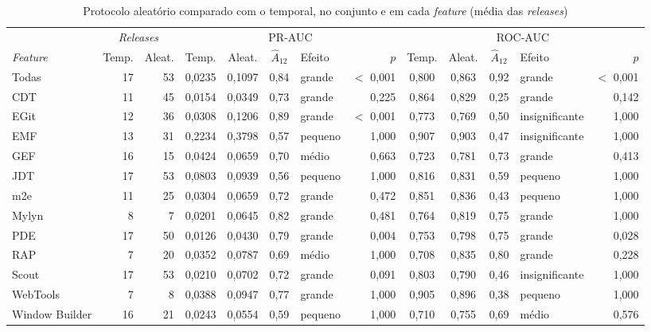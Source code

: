 \begin{table}[htbp]
    
    \centering
    \scriptsize
    \setlength{\tabcolsep}{3pt}%
    \caption{Protocolo aleatório comparado com o temporal, no conjunto e em cada \textit{feature} (média das \textit{releases})}
    \label{tab:res-a12-features}
    \begin{tabular}{lrrccclrccclr}
        \toprule
         & \multicolumn{2}{c}{\textit{Releases}} & \multicolumn{5}{c}{PR-AUC} & \multicolumn{5}{c}{ROC-AUC} \\
        \cmidrule(lr){2-3}\cmidrule(lr){4-8}\cmidrule(lr){9-13}
        \textit{Feature} & Temp. & Aleat. & Temp. & Aleat. & $\hat{A}_{12}$ & Efeito & $p$ & Temp. & Aleat. & $\hat{A}_{12}$ & Efeito & $p$ \\
        \midrule
        Todas & 17 & 53 & 0,0235 & 0,1097 & 0,84 & grande & $<$ 0,001 & 0,800 & 0,863 & 0,92 & grande & $<$ 0,001 \\
        \midrule
        CDT & 11 & 45 & 0,0154 & 0,0349 & 0,73 & grande & 0,225 & 0,864 & 0,829 & 0,25 & grande & 0,142 \\
        EGit & 12 & 36 & 0,0308 & 0,1206 & 0,89 & grande & $<$ 0,001 & 0,773 & 0,769 & 0,50 & insignificante & 1,000 \\
        EMF & 13 & 31 & 0,2234 & 0,3798 & 0,57 & pequeno & 1,000 & 0,907 & 0,903 & 0,47 & insignificante & 1,000 \\
        GEF & 16 & 15 & 0,0424 & 0,0659 & 0,70 & médio & 0,663 & 0,723 & 0,781 & 0,73 & grande & 0,413 \\
        JDT & 17 & 53 & 0,0803 & 0,0939 & 0,56 & pequeno & 1,000 & 0,816 & 0,831 & 0,59 & pequeno & 1,000 \\
        m2e & 11 & 25 & 0,0304 & 0,0659 & 0,72 & grande & 0,472 & 0,851 & 0,836 & 0,43 & pequeno & 1,000 \\
        Mylyn & 8 & 7 & 0,0201 & 0,0645 & 0,82 & grande & 0,481 & 0,764 & 0,819 & 0,75 & grande & 1,000 \\
        PDE & 17 & 50 & 0,0126 & 0,0430 & 0,79 & grande & 0,004 & 0,753 & 0,798 & 0,75 & grande & 0,028 \\
        RAP & 7 & 20 & 0,0352 & 0,0787 & 0,69 & médio & 1,000 & 0,708 & 0,835 & 0,80 & grande & 0,228 \\
        Scout & 17 & 53 & 0,0210 & 0,0702 & 0,72 & grande & 0,091 & 0,803 & 0,790 & 0,46 & insignificante & 1,000 \\
        WebTools & 7 & 8 & 0,0388 & 0,0947 & 0,77 & grande & 1,000 & 0,905 & 0,896 & 0,38 & pequeno & 1,000 \\
        Window Builder & 16 & 21 & 0,0243 & 0,0554 & 0,59 & pequeno & 1,000 & 0,710 & 0,755 & 0,69 & médio & 0,576 \\
        \bottomrule
    \end{tabular}
\end{table}%
